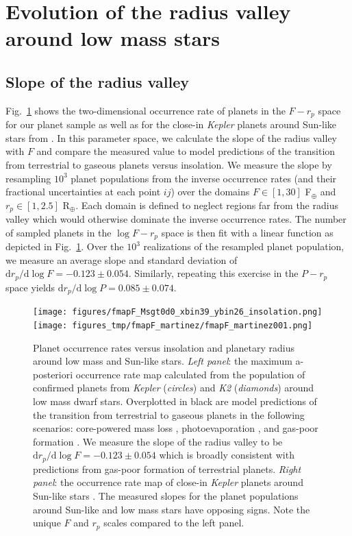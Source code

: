 \documentclass[twocolumn]{emulateapj}
\newcommand{\kepler}[1]{\emph{Kepler}#1}
\newcommand{\ktwo}[1]{\emph{K2}#1}
\begin{document}
\section{Evolution of the radius valley around low mass stars} \label{sect:models}
\subsection{Slope of the radius valley}
Fig.~\ref{fig:fmapF} shows the two-dimensional occurrence rate of planets in the $F-r_p$ space for
our planet sample as well as for the close-in \kepler{} planets around Sun-like stars
from \cite{martinez19}.
In this parameter space, we calculate the slope of the radius valley with $F$ and compare the measured
value to model predictions of the transition from terrestrial to gaseous planets
versus insolation. We measure the slope by resampling $10^3$ planet populations from the inverse
occurrence rates (and their fractional uncertainties at each point $ij$) over the domains
$F\in [1,30]$ F$_{\oplus}$ and $r_p\in [1,2.5]$ R$_{\oplus}$.
Each domain is defined to neglect regions far from the radius valley which would otherwise dominate the
inverse occurrence rates. The number of sampled planets in the $\log{F}-r_p$ space is then fit with a
linear function as depicted in Fig.~\ref{fig:fmapF}. Over the $10^3$ realizations of the resampled planet
population, we measure an average slope and standard deviation of
$\text{d}r_p / \text{d}\log{F} = -0.123\pm 0.054$. Similarly, repeating this exercise in the $P-r_p$
space yields $\text{d}r_p / \text{d}\log{P} = 0.085\pm 0.074$.


\begin{figure}
  \centering
  \texttt{[image: figures/fmapF\_Msgt0d0\_xbin39\_ybin26\_insolation.png]}
  \texttt{[image: figures\_tmp/fmapF\_martinez/fmapF\_martinez001.png]}
  \caption{Planet occurrence rates versus insolation and planetary radius around low mass and Sun-like stars.
    \emph{Left panel}: the maximum a-posteriori occurrence
    rate map calculated from the population of confirmed planets from \kepler{} (\emph{circles}) and
    \ktwo{} (\emph{diamonds}) around low mass dwarf
    stars. Overplotted in black are model predictions of the transition from terrestrial to gaseous
    planets in the following scenarios: core-powered mass loss \citep{gupta19b}, photoevaporation
    \citep{lopez18}, and gas-poor formation \cite{lopez18}. We measure the slope of the radius valley
    to be $\text{d}r_p / \text{d}\log{F} = -0.123\pm 0.054$ which is broadly consistent with predictions
    from gas-poor formation of terrestrial planets. \emph{Right panel}: the occurrence rate map of close-in
    \kepler{} planets around Sun-like stars \citep{martinez19}. The measured slopes for the planet populations
    around Sun-like and low mass stars have opposing signs. Note the unique $F$ and $r_p$ scales compared
    to the left panel.}
  \label{fig:fmapF}
\end{figure}
\end{document}
